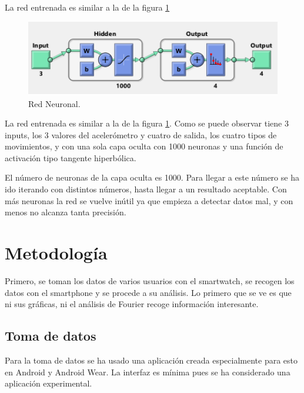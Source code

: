 \documentclass[12pt]{article}
\numberwithin{equation}{section}
\begin{document}
La red entrenada es similar a la de la figura \ref{fig:redneuronal}

\begin{figure}[h]
    \centering
    \includegraphics[width=1\textwidth]{redneuronal.png}
    \caption{Red Neuronal.}
    \label{fig:redneuronal}
\end{figure}

La red entrenada es similar a la de la figura \ref{fig:redneuronal}. Como se puede observar tiene 3 inputs, los 3 valores del acelerómetro y cuatro de salida, los cuatro tipos de movimientos, y con una sola capa oculta con 1000 neuronas y una función de activación tipo tangente hiperbólica.

El número de neuronas de la capa oculta es 1000. Para llegar a este número se ha ido iterando con distintos números, hasta llegar a un resultado aceptable. Con más neuronas la red se vuelve inútil ya que empieza a detectar datos mal, y con menos no alcanza tanta precisión.


\newpage
\section{Metodología}
Primero, se toman los datos de varios usuarios con el smartwatch, se recogen los datos con el smartphone y se procede a su análisis. Lo primero que se ve es que ni sus gráficas, ni el análisis de Fourier recoge información interesante.

\subsection{Toma de datos}

Para la toma de datos se ha usado una aplicación creada especialmente para esto en Android y Android Wear. La interfaz es mínima pues se ha considerado una aplicación experimental.
\end{document}

